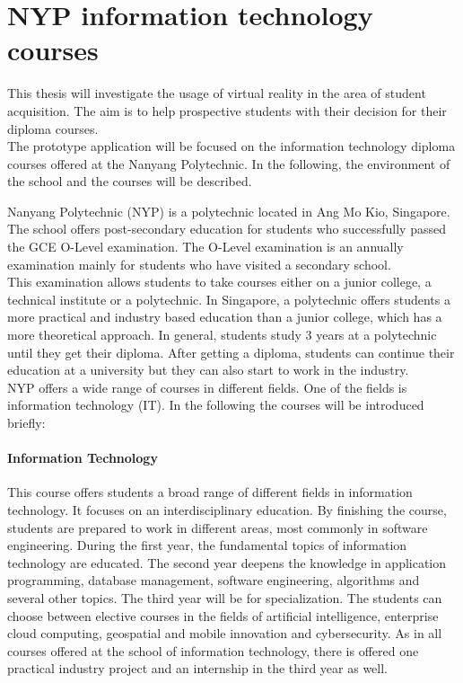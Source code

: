 \section{NYP information technology courses}
This thesis will investigate the usage of virtual reality in the area of student acquisition. The aim is to help prospective students with their decision for their diploma courses.\\
The prototype application will be focused on the information technology diploma courses offered at the Nanyang Polytechnic. In the following, the environment of the school and the courses will be described.

Nanyang Polytechnic (NYP) is a polytechnic located in Ang Mo Kio, Singapore. The school offers post-secondary education for students who successfully passed the GCE O-Level examination. The O-Level examination is an annually examination mainly for students who have visited a secondary school. \cite{aboutOLevel} \\ 
This examination allows students to take courses either on a junior college, a technical institute or a polytechnic. In Singapore, a polytechnic offers students a more practical and industry based education than a junior college, which has a more theoretical approach. In general, students study 3 years at a polytechnic until they get their diploma. After getting a diploma, students can continue their education at a university but they can also start to work in the industry. \cite{schoolSystem}\\
NYP offers a wide range of courses in different fields. One of the fields is information technology (IT). In the following the courses will be introduced briefly: \cite{nypCourses}

\paragraph{Information Technology}
This course offers students a broad range of different fields in information technology. It focuses on an interdisciplinary education. By finishing the course, students are prepared to work in different areas, most commonly in software engineering. During the first year, the fundamental topics of information technology are educated. The second year deepens the knowledge in application programming, database management, software engineering, algorithms and several other topics. The third year will be for specialization. The students can choose between elective courses in the fields of artificial intelligence, enterprise cloud computing, geospatial and mobile innovation and cybersecurity. As in all courses offered at the school of information technology, there is offered one practical industry project and an internship in the third year as well.

